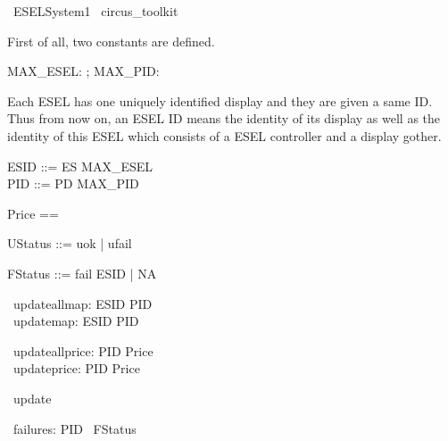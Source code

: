 \begin{zsection}
	\SECTION\ ESELSystem1 \parents\ circus\_toolkit
\end{zsection}

First of all, two constants are defined. 
\begin{axdef}
    MAX\_ESEL: \nat; MAX\_PID: \nat
\end{axdef}

Each ESEL has one uniquely identified display and they are given a same ID. Thus from now on, an ESEL ID means the identity of its display as well as the identity of this ESEL which consists of a ESEL controller and a display gother.
\begin{zed}
    ESID ::= ES  \upto MAX\_ESEL \rdata \\
    PID ::= PD  \upto MAX\_PID \rdata
\end{zed}

\begin{zed}
    Price == \nat
\end{zed}

\begin{zed}
    UStatus ::= uok | ufail
\end{zed}

\begin{zed}
    FStatus ::= fail \ldata ESID \rdata | NA 
\end{zed}

\begin{circus}
	\circchannel\ updateallmap: ESID \pfun PID \\
	\circchannel\ updatemap: ESID \pfun PID
\end{circus}

\begin{circus}
	\circchannel\ updateallprice: PID \pfun Price \\
	\circchannel\ updateprice: PID \pfun Price
\end{circus}

\begin{circus}
	\circchannel\ update
\end{circus}

\begin{circus}
	\circchannel\ failures: PID \pfun \power~FStatus \\
\end{circus}

